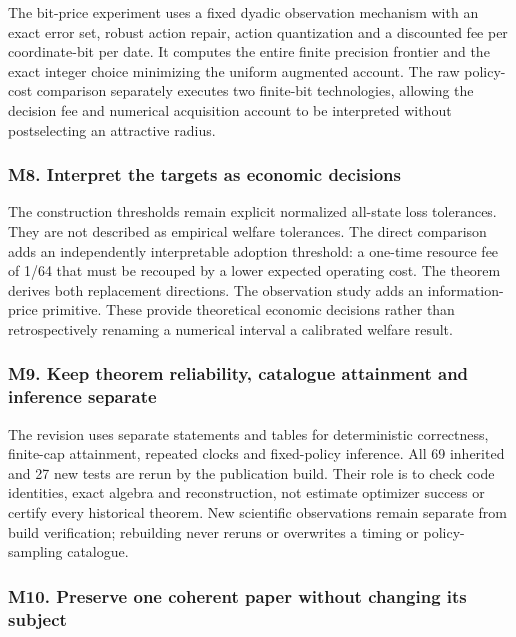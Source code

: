 \documentclass[ecta,nameyear,draft]{econsocart}
\begin{document}
The bit-price experiment uses a fixed dyadic observation mechanism with
an exact error set, robust action repair, action quantization and a
discounted fee per coordinate-bit per date. It computes the entire
finite precision frontier and the exact integer choice minimizing the
uniform augmented account. The raw policy-cost comparison separately
executes two finite-bit technologies, allowing the decision fee and
numerical acquisition account to be interpreted without postselecting an
attractive radius.

\hypertarget{m8-interpret-the-targets-as-economic-decisions}{%
\subsubsection{M8. Interpret the targets as economic
decisions}\label{m8-interpret-the-targets-as-economic-decisions}}

The construction thresholds remain explicit normalized all-state loss
tolerances. They are not described as empirical welfare tolerances. The
direct comparison adds an independently interpretable adoption
threshold: a one-time resource fee of 1/64 that must be recouped by a
lower expected operating cost. The theorem derives both replacement
directions. The observation study adds an information-price primitive.
These provide theoretical economic decisions rather than retrospectively
renaming a numerical interval a calibrated welfare result.

\hypertarget{m9-keep-theorem-reliability-catalogue-attainment-and-inference-separate}{%
\subsubsection{M9. Keep theorem reliability, catalogue attainment and
inference
separate}\label{m9-keep-theorem-reliability-catalogue-attainment-and-inference-separate}}

The revision uses separate statements and tables for deterministic
correctness, finite-cap attainment, repeated clocks and fixed-policy
inference. All 69 inherited and 27 new tests are rerun by the
publication build. Their role is to check code identities, exact algebra
and reconstruction, not estimate optimizer success or certify every
historical theorem. New scientific observations remain separate from
build verification; rebuilding never reruns or overwrites a timing or
policy-sampling catalogue.

\hypertarget{m10-preserve-one-coherent-paper-without-changing-its-subject}{%
\subsubsection{M10. Preserve one coherent paper without changing its
subject}\label{m10-preserve-one-coherent-paper-without-changing-its-subject}}
\end{document}
